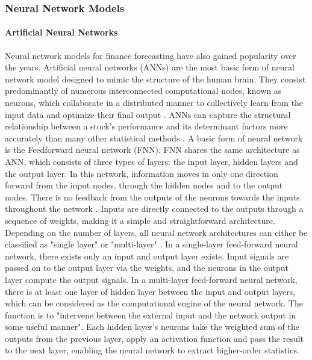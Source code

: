 \documentclass{article}
\begin{document}
\subsubsection{Neural Network Models}
\paragraph{Artificial Neural Networks}
Neural network models for finance forecasting have also gained popularity over the years. Artificial neural networks (ANNs) are the most basic form of neural network model designed to mimic the structure of the human brain. They consist predominantly of numerous interconnected computational nodes, known as neurons, which collaborate in a distributed manner to collectively learn from the input data and optimize their final output \citep{o2015introduction}. ANNs can capture the structural relationship between a stock's performance and its determinant factors more accurately than many other statistical methods \citep{gandhmal2019systematic, selvin2017stock}. A basic form of neural network is the Feedforward neural network (FNN). FNN shares the same architecture as ANN, which consists of three types of layers: the input layer, hidden layers and the output layer. In this network, information moves in only one direction forward from the input nodes, through the hidden nodes and to the output nodes. There is no feedback from the outputs of the neurons towards the inputs throughout the network \citep{bebis1994feed}. Inputs are directly connected to the outputs through a sequence of weights, making it a simple and straightforward architecture. Depending on the number of layers, all neural network architectures can either be classified as "single layer" or "multi-layer" \citep{deboeck1994trading}. In a single-layer feed-forward neural network, there exists only an input and output layer exists. Input signals are passed on to the output layer via the weights, and the neurons in the output layer compute the output signals. In a multi-layer feed-forward neural network, there is at least one layer of hidden layer between the input and output layers, which can be considered as the computational engine of the neural network. The function is to "intervene between the external input and the network output in some useful manner". Each hidden layer's neurons take the weighted sum of the outputs from the previous layer, apply an activation function and pass the result to the next layer, enabling the neural network to extract higher-order statistics.
\end{document}
